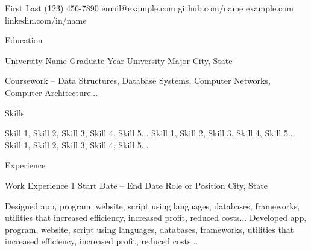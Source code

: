 \documentclass[11pt]{cv_template}
\begin{document}

\begin{cv}

\cvheader
{First Last}
{(123) 456-7890}
{email@example.com}
{github.com/name}
{example.com}
{linkedin.com/in/name}


\begin{cvsection}{Education}


\begin{cvsubsection}
{University Name}  {Graduate Year}
{University Major} {City, State}

\listitem[] Coursework -- Data Structures, Database Systems, Computer Networks, Computer Architecture...

\end{cvsubsection}

\end{cvsection}


\begin{cvsection}{Skills}

 Skill 1, Skill 2, Skill 3, Skill 4, Skill 5...
 Skill 1, Skill 2, Skill 3, Skill 4, Skill 5...
 Skill 1, Skill 2, Skill 3, Skill 4, Skill 5...

\end{cvsection}


\begin{cvsection}{Experience}


\begin{cvsubsection}
{Work Experience 1} {Start Date -- End Date}
{Role or Position} {City, State}

\listitem Designed app, program, website, script using languages,     databases, frameworks, utilities that increased efficiency, increased    profit, reduced costs...
\listitem Developed app, program, website, script using languages,    databases, frameworks, utilities that increased efficiency, increased    profit, reduced costs...


\end{cvsubsection}
\end{cvsection}
\end{cv}
\end{document}
